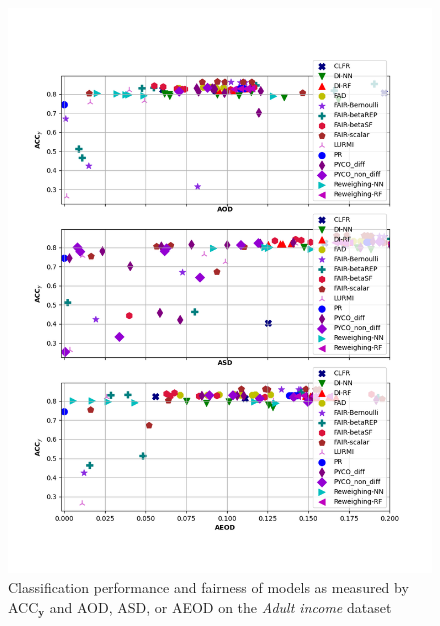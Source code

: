 \documentclass[preprint,12pt]{elsarticle}
\begin{document}
\begin{figure}
	\center
	\includegraphics[angle=0, width=1\textwidth]{Adult_all_ACC.png}
	\captionsetup{justification=centering}
	\caption{Classification performance and fairness of models as measured by ACC$_\mathbf{y}$ and AOD, ASD, or AEOD on the \textit{Adult income} dataset}
	\label{fig:Adult all-acc}
	\vskip -0.2in
\end{figure}
\end{document}
